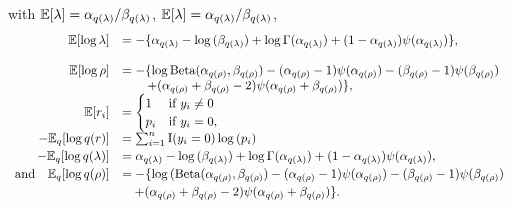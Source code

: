\documentclass[11pt]{amsart}
\begin{document}
\noindent with 
${\mathbb E}[\lambda] = \alpha_{q(\lambda)}/\beta_{q(\lambda)}$,
${\mathbb E} [\lambda] = \alpha_{q(\lambda)}/\beta_{q(\lambda)}$,
$$
\begin{array}{rl}
	{\mathbb E} [\log{\lambda}] & = -\{ \alpha_{q(\lambda)} - \log{(\beta_{q(\lambda)})} + \log{\Gamma(\alpha_{q(\lambda)})} + (1 - \alpha_{q(\lambda)}) \psi{(\alpha_{q(\lambda)})} \},        \\
	\\
	{\mathbb E}[\log{\rho}]     & = - \{ \log{\text{Beta}(\alpha_{q(\rho)}, \beta_{q(\rho)})} - (\alpha_{q(\rho)} - 1) \psi{(\alpha_{q(\rho)})} - (\beta_{q(\rho)} - 1)\psi{(\beta_{q(\rho)})}  \\
	                    & \qquad + (\alpha_{q(\rho)} + \beta_{q(\rho)} - 2)\psi{(\alpha_{q(\rho)} + \beta_{q(\rho)})} \},                                                               
	\\
	{\mathbb E}[r_i]            & =                                                                                                                                                             
	\begin{cases}
	1                   & \text{if } y_i \ne 0                                                                                                                                          \\
	p_i                 & \text{if } y_i = 0,                                                                                                                                           \\
	\end{cases}
	\\
	-{\mathbb E}_q[\log{q(r)}]  & = \sum_{i=1}^n \text{I}(y_i = 0) \log{(p_i)}                                                                                                                        \\ [0.5ex]
	-{\mathbb E}_q[\log{q(\lambda)}] 
	                    & = \alpha_{q(\lambda)} - \log{(\beta_{q(\lambda)})} + \log{\Gamma{(\alpha_{q(\lambda)})}} + (1 - \alpha_{q(\lambda)}) \psi{(\alpha_{q(\lambda)})},             \\ [0.5ex]
	\mbox{and}\quad {\mathbb E}_q[\log{q(\rho)}] 
	                    & = - \{ \log{(\text{Beta}(\alpha_{q(\rho)}, \beta_{q(\rho)})} - (\alpha_{q(\rho)} - 1) \psi{(\alpha_{q(\rho)})} - (\beta_{q(\rho)} - 1)\psi{(\beta_{q(\rho)})} \\ [0.5ex]
	                    & \quad + (\alpha_{q(\rho)} + \beta_{q(\rho)} - 2)\psi{(\alpha_{q(\rho)} + \beta_{q(\rho)})} \}.                                                                \\ [0.5ex]
\end{array}
$$
\end{document}
